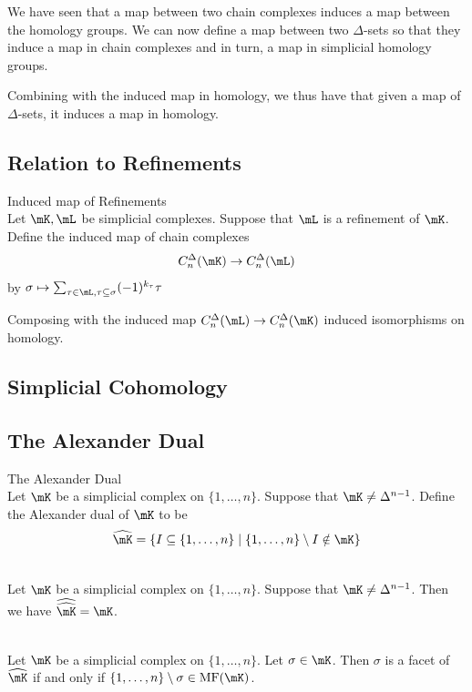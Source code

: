 \documentclass[a4paper]{article}
\begin{document}
We have seen that a map between two chain complexes induces a map between the homology groups. We can now define a map between two $\Delta$-sets so that they induce a map in chain complexes and in turn, a map in simplicial homology groups. 

Combining with the induced map in homology, we thus have that given a map of $\Delta$-sets, it induces a map in homology. 

\subsection{Relation to Refinements}
\begin{defn}{Induced map of Refinements}{}\\
Let $\mK,\mL$ be simplicial complexes. Suppose that $\mL$ is a refinement of $\mK$. Define the induced map of chain complexes $$C_n^\Delta(\mK)\to C_n^\Delta(\mL)$$ by $\sigma\mapsto\sum_{\tau\in\mL,\tau\subseteq\sigma}(-1)^{k_\tau}\tau$
\end{defn}

Composing with the induced map $C_n^\Delta(\mL)\to C_n^\Delta(\mK)$ induced isomorphisms on homology. 

\subsection{Simplicial Cohomology}

\subsection{The Alexander Dual}
\begin{defn}{The Alexander Dual}{}\\
Let $\mK$ be a simplicial complex on $\{1,\dots,n\}$. Suppose that $\mK\neq\Delta^{n-1}$. Define the Alexander dual of $\mK$ to be $$\widehat{\mK}=\{I\subseteq\{1,\dots,n\}\;|\;\{1,\dots,n\}\setminus I\notin\mK\}$$
\end{defn}

\begin{lmm}{}{}\\
Let $\mK$ be a simplicial complex on $\{1,\dots,n\}$. Suppose that $\mK\neq\Delta^{n-1}$. Then we have $\widehat{\widehat{\mK}}=\mK$. 
\end{lmm}

\begin{lmm}{}{}\\
Let $\mK$ be a simplicial complex on $\{1,\dots,n\}$. Let $\sigma\in\mK$. Then $\sigma$ is a facet of $\widehat{\mK}$ if and only if $\{1,\dots,n\}\setminus\sigma\in\text{MF}(\mK)$. 
\end{lmm}
\end{document}
